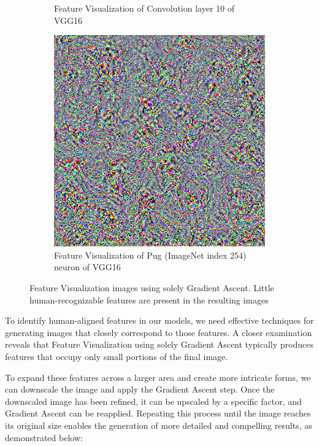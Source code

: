 \begin{figure}
\begin{subfigure}[t]{0.28\textwidth}
        \caption{Feature Visualization of Convolution layer 10 of VGG16}
    \end{subfigure}
    \hfill
    \begin{subfigure}[t]{0.28\textwidth}
        \captionsetup{justification=centering}
        \centering
        \includegraphics[width=.7\linewidth]{figuras/feat_vis/random_image_dream_class_254.png}
        \caption{Feature Visualization of Pug (ImageNet index 254) neuron of VGG16}
    \end{subfigure}

    \caption{
        Feature Visualization images using solely Gradient Ascent. 
    Little human-recognizable features are present in the resulting images
    }
\end{figure}

To identify human-aligned features in our models, we need effective techniques for generating images that closely correspond to those features. 
A closer examination reveals that Feature Visualization using solely Gradient Ascent typically produces features that occupy only small portions of the final image.

To expand these features across a larger area and create more intricate forms, we can downscale the image and apply the Gradient Ascent step. 
Once the downscaled image has been refined, it can be upscaled by a specific factor, and Gradient Ascent can be reapplied. 
\newpage
\noindent
Repeating this process until the image reaches its original size enables the generation of more detailed and compelling results, as demonstrated below:

